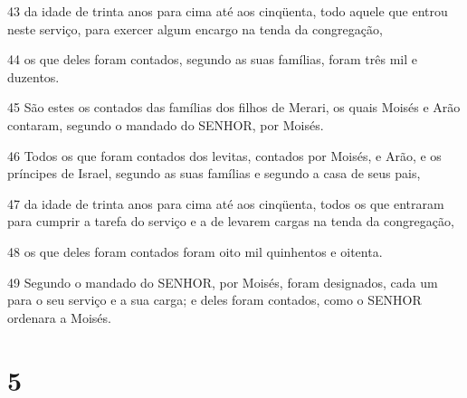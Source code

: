 \par 43 da idade de trinta anos para cima até aos cinqüenta, todo aquele que entrou neste serviço, para exercer algum encargo na tenda da congregação,
\par 44 os que deles foram contados, segundo as suas famílias, foram três mil e duzentos.
\par 45 São estes os contados das famílias dos filhos de Merari, os quais Moisés e Arão contaram, segundo o mandado do SENHOR, por Moisés.
\par 46 Todos os que foram contados dos levitas, contados por Moisés, e Arão, e os príncipes de Israel, segundo as suas famílias e segundo a casa de seus pais,
\par 47 da idade de trinta anos para cima até aos cinqüenta, todos os que entraram para cumprir a tarefa do serviço e a de levarem cargas na tenda da congregação,
\par 48 os que deles foram contados foram oito mil quinhentos e oitenta.
\par 49 Segundo o mandado do SENHOR, por Moisés, foram designados, cada um para o seu serviço e a sua carga; e deles foram contados, como o SENHOR ordenara a Moisés.

\chapter{5}

